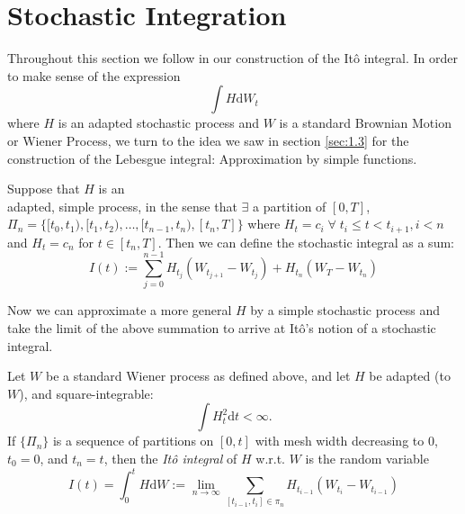 \section{Stochastic Integration}\label{sec:1.5}

Throughout this section we follow \cite{SCfFII} in our construction of the It\^{o} 
integral. In order to make sense of the expression 
\begin{equation*}
    \int H\mathrm dW_t
\end{equation*}
where $H$ is an adapted stochastic process and $W$ is a standard Brownian Motion or 
Wiener Process, we turn to the idea we saw in section \ref{sec:1.3}
for the construction of the Lebesgue integral: Approximation by simple functions.

\begin{definition}
    Suppose that $H$ is an\\ adapted, simple process, in the sense that $\exists$ a 
    partition of $[0,T]$, \\$\Pi_n=\{[t_0,t_1),[t_1,t_2),\dots,[t_{n-1},t_n),[t_n,T]\}$ where 
    $H_t=c_i\;\forall\;t_i\leq t<t_{i+1}, i < n$ and $H_t=c_n$ for $t\in[t_n,T]$.
    Then we can define the stochastic integral as a sum:
    \begin{equation}
        I(t):=\sum_{j=0}^{n-1}H_{t_j}(W_{t_{j+1}}-W_{t_j})+H_{t_n}(W_T-W_{t_n})
    \end{equation}     
\end{definition}

Now we can approximate a more general $H$ by a simple stochastic process and 
take the limit of the above summation to arrive at It\^{o}'s notion of a stochastic 
integral.

\begin{definition}
    Let $W$ be a standard Wiener process as defined above, and let $H$ be adapted 
    (to $W$), and square-integrable:
    \begin{equation*}
        \int H_t^2\mathrm dt<\infty.
    \end{equation*}
    If $\{\Pi_n\}$ is a sequence of partitions on $[0,t]$ with mesh width decreasing
    to $0$, $t_0=0$, and $t_n=t$, then the \emph{It\^{o} integral} of $H$
    w.r.t. $W$ is the random variable
    \begin{equation}
        I(t)=\int_0^tH\mathrm dW:=\lim_{n\rightarrow\infty}\sum_{[t_{i-1},t_i]\in\pi_n}H_{t_{i-1}}(W_{t_i}-W_{t_{i-1}})
    \end{equation}
\end{definition}

